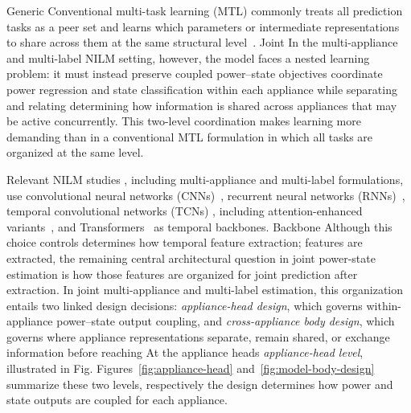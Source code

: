 \documentclass[journal]{IEEEtran}
\providecommand{\DIFadd}[1]{{\protect\color{blue} \sf #1}} %
\providecommand{\DIFdel}[1]{{\protect\color{red} \scriptsize #1}} %
\providecommand{\DIFaddbegin}{} %
\providecommand{\DIFaddend}{} %
\providecommand{\DIFdelbegin}{} %
\providecommand{\DIFdelend}{} %
\providecommand{\DIFscaledelfig}{0.5}
\newlength{\DIFdelgraphicswidth} %
\newlength{\DIFdelgraphicsheight} %
\providecommand{\DIFaddincludegraphics}[2][]{{\color{blue}\fbox{\DIFOincludegraphics[#1]{#2}}}} %
\providecommand{\DIFdelincludegraphics}[2][]{%
\sbox{\DIFdelgraphicsbox}{\DIFOincludegraphics[#1]{#2}}%
\settoboxwidth{\DIFdelgraphicswidth}{\DIFdelgraphicsbox} %
\settoboxtotalheight{\DIFdelgraphicsheight}{\DIFdelgraphicsbox} %
\scalebox{\DIFscaledelfig}{%
\parbox[b]{\DIFdelgraphicswidth}{\usebox{\DIFdelgraphicsbox}\\[-\baselineskip] \rule{\DIFdelgraphicswidth}{0em}}\llap{\resizebox{\DIFdelgraphicswidth}{\DIFdelgraphicsheight}{%
\setlength{\unitlength}{\DIFdelgraphicswidth}%
\begin{picture}(1,1)%
\thicklines\linethickness{2pt} %
{\color[rgb]{1,0,0}\put(0,0){\framebox(1,1){}}}%
{\color[rgb]{1,0,0}\put(0,0){\line( 1,1){1}}}%
{\color[rgb]{1,0,0}\put(0,1){\line(1,-1){1}}}%
\end{picture}%
}\hspace*{3pt}}} %
} %
\DeclareRobustCommand{\DIFaddbegin}{\DIFOaddbegin \let\includegraphics\DIFaddincludegraphics} %
\DeclareRobustCommand{\DIFaddend}{\DIFOaddend \let\includegraphics\DIFOincludegraphics} %
\DeclareRobustCommand{\DIFdelbegin}{\DIFOdelbegin \let\includegraphics\DIFdelincludegraphics} %
\DeclareRobustCommand{\DIFdelend}{\DIFOaddend \let\includegraphics\DIFOincludegraphics} %
\begin{document}
\DIFdel{Generic }\DIFdelend \DIFaddbegin \DIFadd{Conventional }\DIFaddend multi-task learning (MTL) commonly treats \DIFaddbegin \DIFadd{all prediction }\DIFaddend tasks \DIFdelbegin \DIFdel{as a peer set and learns which parameters or intermediate representations to share across them}\DIFdelend \DIFaddbegin \DIFadd{at the same structural level}\DIFaddend ~\cite{vandenhende2022survey}. \DIFdelbegin \DIFdel{Joint }\DIFdelend \DIFaddbegin \DIFadd{In the }\DIFaddend multi-appliance and multi-label \DIFdelbegin \DIFdel{NILM }\DIFdelend \DIFaddbegin \DIFadd{setting, however, the model faces a nested learning problem: it }\DIFaddend must \DIFdelbegin \DIFdel{instead preserve coupled power--state objectives }\DIFdelend \DIFaddbegin \DIFadd{coordinate power regression and state classification }\DIFaddend within each appliance while \DIFdelbegin \DIFdel{separating and relating }\DIFdelend \DIFaddbegin \DIFadd{determining how information is shared across }\DIFaddend appliances\DIFdelbegin \DIFdel{that may be active concurrently}\DIFdelend . \DIFaddbegin \DIFadd{This two-level coordination makes learning more demanding than in a conventional MTL formulation in which all tasks are organized at the same level.
}\DIFaddend 

Relevant NILM studies \DIFdelbegin \DIFdel{, including multi-appliance and multi-label formulations, }\DIFdelend use convolutional neural networks (CNNs)~\cite{faustine2020unet,xiong2024matnilm}, recurrent neural networks (RNNs)~\cite{murray2019transferability}, temporal convolutional networks (TCNs)\DIFdelbegin \DIFdel{, including attention-enhanced variants}\DIFdelend ~\cite{alami2023convnilm,dash2024jestie}, and Transformers~\cite{sun2025transfer} \DIFaddbegin \DIFadd{as temporal backbones}\DIFaddend . \DIFdelbegin \DIFdel{Backbone }\DIFdelend \DIFaddbegin \DIFadd{Although this }\DIFaddend choice \DIFdelbegin \DIFdel{controls }\DIFdelend \DIFaddbegin \DIFadd{determines how }\DIFaddend temporal \DIFdelbegin \DIFdel{feature extraction; }\DIFdelend \DIFaddbegin \DIFadd{features are extracted, }\DIFaddend the \DIFdelbegin \DIFdel{remaining }\DIFdelend \DIFaddbegin \DIFadd{central }\DIFaddend architectural question \DIFaddbegin \DIFadd{in joint power-state estimation }\DIFaddend is how those features are organized \DIFdelbegin \DIFdel{for joint prediction}\DIFdelend \DIFaddbegin \DIFadd{after extraction}\DIFaddend . \DIFdelbegin \DIFdel{In joint multi-appliance and multi-label estimation, this organization entails two linked design decisions: \emph{appliance-head design}, which governs within-appliance power--state output coupling, and \emph{cross-appliance body design}, which governs where appliance representations separate, remain shared, or exchange information before reaching }\DIFdelend \DIFaddbegin \DIFadd{At }\DIFaddend the \DIFdelbegin \DIFdel{appliance heads}\DIFdelend \DIFaddbegin \DIFadd{\emph{appliance-head level}, illustrated in Fig}\DIFaddend .\DIFdelbegin \DIFdel{Figures}\DIFdelend ~\ref{fig:appliance-head}\DIFdelbegin \DIFdel{and~\ref{fig:model-body-design} summarize these two levels}\DIFdelend , \DIFdelbegin \DIFdel{respectively}\DIFdelend \DIFaddbegin \DIFadd{the design determines how power and state outputs are coupled for each appliance}\DIFaddend . \DIFdelbegin %
\end{document}
